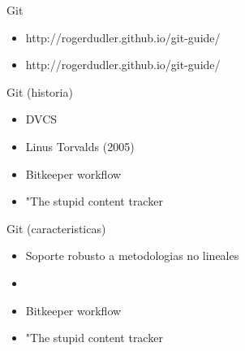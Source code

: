\documentclass{beamer}
\begin{document}
\begin{frame}{Git}
	\begin{itemize}
		\item http://rogerdudler.github.io/git-guide/
		\item http://rogerdudler.github.io/git-guide/
	\end{itemize}
\end{frame}

\begin{frame}{Git (historia)}
	\begin{itemize}
		\item DVCS
		\item Linus Torvalds (2005)
		\item Bitkeeper workflow
		\item "The stupid content tracker
	\end{itemize}
\end{frame}

\begin{frame}{Git (caracteristicas)}
	\begin{itemize}
		\item Soporte robusto a metodologias no lineales
		\item 
		\item Bitkeeper workflow
		\item "The stupid content tracker
	\end{itemize}
\end{frame}
\end{document}
